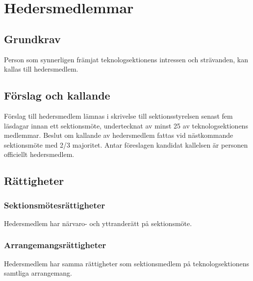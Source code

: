 \section{Hedersmedlemmar}
\label{sec:hedersmedlemmar}

\subsection{Grundkrav}
Person som synnerligen främjat teknologsektionens intressen och strävanden, kan kallas till hedersmedlem.

\subsection{Förslag och kallande}
Förslag till hedersmedlem lämnas i skrivelse till sektionsstyrelsen senast fem läsdagar innan ett sektionsmöte, undertecknat av minst 25 av teknologsektionens medlemmar. Beslut om kallande av hedersmedlem fattas vid nästkommande sektionsmöte med 2/3 majoritet. Antar föreslagen kandidat kallelsen är personen officiellt hedersmedlem.

\subsection{Rättigheter}

\subsubsection{Sektionsmötesrättigheter}
Hedersmedlem har närvaro- och yttranderätt på sektionsmöte.

\subsubsection{Arrangemangsrättigheter}
Hedersmedlem har samma rättigheter som sektionsmedlem på teknologsektionens samtliga arrangemang.